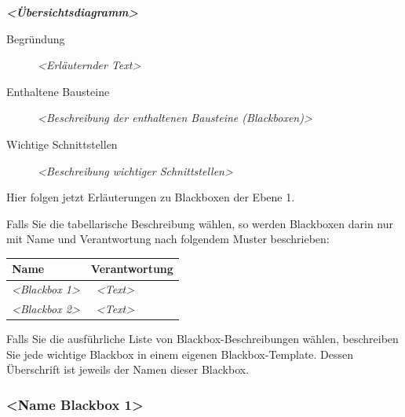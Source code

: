 \documentclass[]{article}
\begin{document}
\emph{\textbf{\textless{}Übersichtsdiagramm\textgreater{}}}

\begin{description}
\item[Begründung]
\emph{\textless{}Erläuternder Text\textgreater{}}
\item[Enthaltene Bausteine]
\emph{\textless{}Beschreibung der enthaltenen Bausteine
(Blackboxen)\textgreater{}}
\item[Wichtige Schnittstellen]
\emph{\textless{}Beschreibung wichtiger Schnittstellen\textgreater{}}
\end{description}

Hier folgen jetzt Erläuterungen zu Blackboxen der Ebene 1.

Falls Sie die tabellarische Beschreibung wählen, so werden Blackboxen
darin nur mit Name und Verantwortung nach folgendem Muster beschrieben:

\begin{longtable}[]{@{}ll@{}}
\toprule
\begin{minipage}[b]{0.31\columnwidth}\raggedright
\textbf{Name}\strut
\end{minipage} & \begin{minipage}[b]{0.63\columnwidth}\raggedright
\textbf{Verantwortung}\strut
\end{minipage}\tabularnewline
\midrule
\endhead
\begin{minipage}[t]{0.31\columnwidth}\raggedright
\emph{\textless{}Blackbox 1\textgreater{}}\strut
\end{minipage} & \begin{minipage}[t]{0.63\columnwidth}\raggedright
~\emph{\textless{}Text\textgreater{}}\strut
\end{minipage}\tabularnewline
\begin{minipage}[t]{0.31\columnwidth}\raggedright
\emph{\textless{}Blackbox 2\textgreater{}}\strut
\end{minipage} & \begin{minipage}[t]{0.63\columnwidth}\raggedright
~\emph{\textless{}Text\textgreater{}}\strut
\end{minipage}\tabularnewline
\bottomrule
\end{longtable}

Falls Sie die ausführliche Liste von Blackbox-Beschreibungen wählen,
beschreiben Sie jede wichtige Blackbox in einem eigenen
Blackbox-Template. Dessen Überschrift ist jeweils der Namen dieser
Blackbox.

\hypertarget{__name_blackbox_1}{%
\subsubsection{\textless{}Name Blackbox
1\textgreater{}}\label{__name_blackbox_1}}
\end{document}
